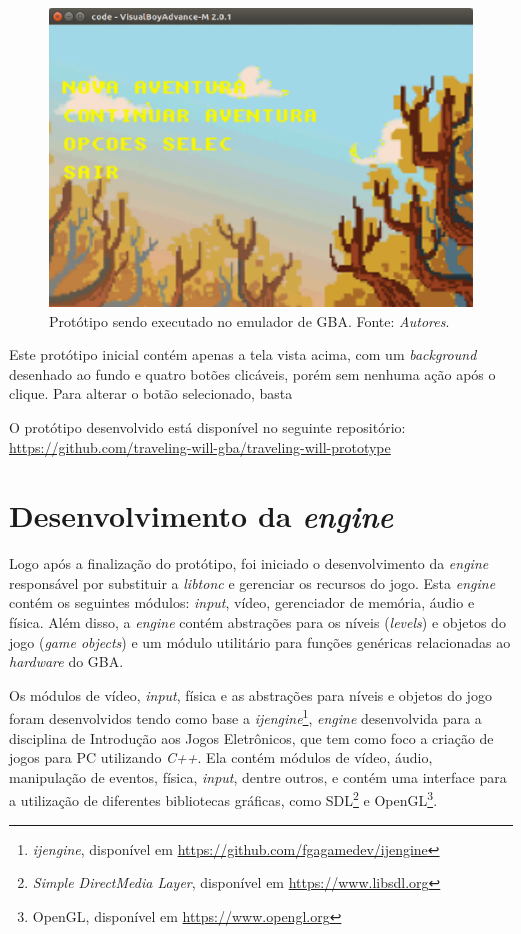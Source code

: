\begin{figure}[H]
 \centering \includegraphics[keepaspectratio=true,scale=0.6]{figuras/tw-gba-1.eps}
   \caption[Protótipo sendo executado no emulador de GBA]
    {Protótipo sendo executado no emulador de GBA. Fonte: \textit{Autores}.}
   \label{tw-gba-1}
\end{figure}

Este protótipo inicial contém apenas a tela vista acima, com um \textit{background} desenhado ao fundo e quatro botões clicáveis, porém sem nenhuma ação após o clique. Para alterar o botão selecionado, basta

O protótipo desenvolvido está disponível no seguinte repositório: \url{https://github.com/traveling-will-gba/traveling-will-prototype}

\section{Desenvolvimento da \textit{engine}}

  Logo após a finalização do protótipo, foi iniciado o desenvolvimento da \textit{engine} responsável por substituir a \textit{libtonc} e gerenciar os recursos do jogo. Esta \textit{engine} contém os seguintes módulos: \textit{input}, vídeo, gerenciador de memória, áudio e física. Além disso, a \textit{engine} contém abstrações para os níveis (\textit{levels}) e objetos do jogo (\textit{game objects}) e um módulo utilitário para funções genéricas relacionadas ao \textit{hardware} do GBA.

  Os módulos de vídeo, \textit{input}, física e as abstrações para níveis e objetos do jogo foram desenvolvidos tendo como base a \textit{ijengine}\footnote{\textit{ijengine}, disponível em \url{https://github.com/fgagamedev/ijengine}}, \textit{engine} desenvolvida para a disciplina de Introdução aos Jogos Eletrônicos, que tem como foco a criação de jogos para PC utilizando \textit{C++}. Ela contém módulos de vídeo, áudio, manipulação de eventos, física, \textit{input}, dentre outros, e contém uma interface para a utilização de diferentes bibliotecas gráficas, como SDL\footnote{\textit{Simple DirectMedia Layer}, disponível em \url{https://www.libsdl.org}} e OpenGL\footnote{OpenGL, disponível em \url{https://www.opengl.org}}.


